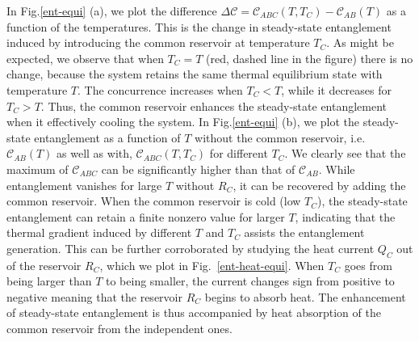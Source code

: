 \documentclass[12pt]{iopart}
\begin{document}
In Fig.\ref{ent-equi} (a), we plot the difference $\Delta\mathcal{C} = \mathcal{C}_{ABC}(T,T_C) - \mathcal{C}_{AB}(T)$ as a function of the temperatures. This is the change in steady-state entanglement induced by introducing the common reservoir at temperature $T_C$. As might be expected, we observe that when $T_{C}=T$ (red, dashed line in the figure) there is no change, because the system retains the same thermal equilibrium state with temperature $T$. The concurrence increases when $T_C < T$, while it decreases for $T_C > T$. Thus, the common reservoir enhances the steady-state entanglement when it effectively cooling the system. In Fig.\ref{ent-equi} (b), we plot the steady-state entanglement as a function of $T$ without the common reservoir, i.e.~$\mathcal{C}_{AB}(T)$ as well as with, $\mathcal{C}_{ABC}(T,T_C)$ for different $T_C$. We clearly see that the maximum of $\mathcal{C}_{ABC}$ can be significantly higher than that of $\mathcal{C}_{AB}$. While entanglement vanishes for large $T$ without $R_C$, it can be recovered by adding the common reservoir. When the common reservoir is cold (low $T_C$), the steady-state entanglement can retain a finite nonzero value for larger $T$, indicating that the thermal gradient induced by different $T$ and $T_C$ assists the entanglement generation. This can be further corroborated by studying the heat current $Q_{C}$ out of the reservoir $R_{C}$, which we plot in Fig.~\ref{ent-heat-equi}. When $T_C$ goes from being larger than $T$ to being smaller, the current changes sign from positive to negative meaning that the reservoir $R_{C}$ begins to absorb heat. The enhancement of steady-state entanglement is thus accompanied by heat absorption of the common reservoir from the independent ones.
\end{document}
